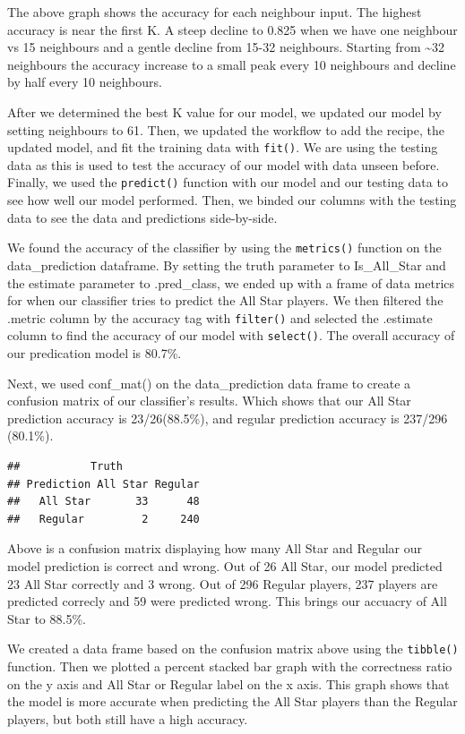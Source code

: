\documentclass[
]{article}
\begin{document}
The above graph shows the accuracy for each neighbour input. The highest accuracy is near the first K. A steep decline to 0.825 when we have one neighbour vs 15 neighbours and a gentle decline from 15-32 neighbours. Starting from \textasciitilde32 neighbours the accuracy increase to a small peak every 10 neighbours and decline by half every 10 neighbours.

After we determined the best K value for our model, we updated our model by setting neighbours to 61. Then, we updated the workflow to add the recipe, the updated model, and fit the training data with \texttt{fit()}. We are using the testing data as this is used to test the accuracy of our model with data unseen before. Finally, we used the \texttt{predict()} function with our model and our testing data to see how well our model performed. Then, we binded our columns with the testing data to see the data and predictions side-by-side.

We found the accuracy of the classifier by using the \texttt{metrics()} function on the data\_prediction dataframe. By setting the truth parameter to Is\_All\_Star and the estimate parameter to .pred\_class, we ended up with a frame of data metrics for when our classifier tries to predict the All Star players. We then filtered the .metric column by the accuracy tag with \texttt{filter()} and selected the .estimate column to find the accuracy of our model with \texttt{select()}. The overall accuracy of our predication model is 80.7\%.

Next, we used conf\_mat() on the data\_prediction data frame to create a confusion matrix of our classifier's results. Which shows that our All Star prediction accuracy is 23/26(88.5\%), and regular prediction accuracy is 237/296 (80.1\%).

\begin{verbatim}
##           Truth
## Prediction All Star Regular
##   All Star       33      48
##   Regular         2     240
\end{verbatim}

Above is a confusion matrix displaying how many All Star and Regular our model prediction is correct and wrong. Out of 26 All Star, our model predicted 23 All Star correctly and 3 wrong. Out of 296 Regular players, 237 players are predicted correcly and 59 were predicted wrong. This brings our accuacry of All Star to 88.5\%.

We created a data frame based on the confusion matrix above using the \texttt{tibble()} function. Then we plotted a percent stacked bar graph with the correctness ratio on the y axis and All Star or Regular label on the x axis. This graph shows that the model is more accurate when predicting the All Star players than the Regular players, but both still have a high accuracy.
\end{document}
